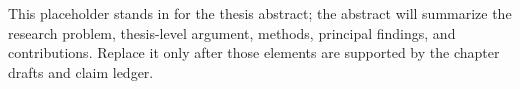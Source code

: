 \begin{storyabstract}[en]
    This placeholder stands in for the thesis abstract; the abstract will summarize the research problem, thesis-level argument, methods, principal findings, and contributions.
    Replace it only after those elements are supported by the chapter drafts and claim ledger.
\end{storyabstract}
